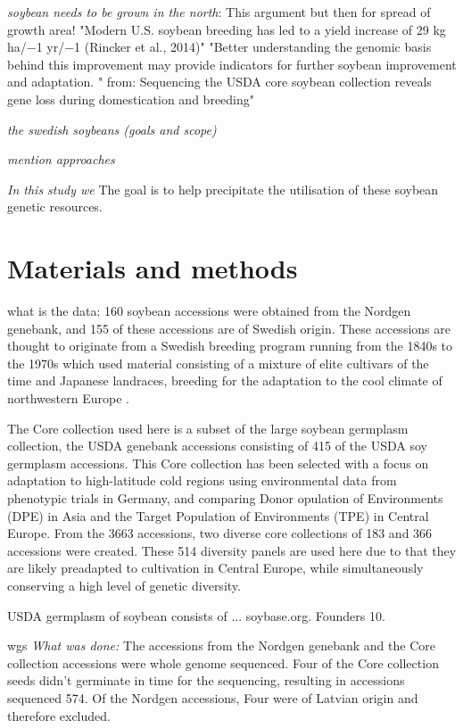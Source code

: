 \documentclass[9pt, onecolumn,twoside]{gsajnl}
\begin{document}
\textit{soybean needs to be grown in the north}:  This argument but then for spread of growth area! "Modern U.S. soybean breeding has led to a yield increase of 29 kg ha/−1 yr/−1 (Rincker et al., 2014)" 
 "Better understanding the genomic basis behind this improvement may provide indicators for further soybean improvement and adaptation. "  from: Sequencing the USDA core soybean collection reveals gene loss during domestication and breeding"

\textit{the swedish soybeans (goals and scope)}

\textit{mention approaches}

\textit{In this study we}
The goal is to help precipitate the utilisation of these soybean genetic resources. 

\section{Materials and methods}
\label{sec:materials:methods}

what is the data: 160 soybean accessions were obtained from the Nordgen genebank, and 155 of these accessions are of Swedish origin. These accessions are thought to originate from a Swedish breeding program running from the 1840s to the 1970s which used material consisting of a mixture of elite cultivars of the time and Japanese landraces, breeding for the adaptation to the cool climate of northwestern Europe \cite{holmberg1973}. 
 
The Core collection used here is a subset of the large soybean germplasm collection, the  USDA genebank accessions consisting of 415 of the USDA soy germplasm accessions. This Core collection has been selected with a focus on adaptation to high-latitude cold regions using environmental data from phenotypic trials in Germany, and comparing Donor opulation of Environments (DPE) in Asia and the Target Population of Environments (TPE) in Central Europe. From the 3663 accessions, two diverse core collections of 183 and 366 accessions were created. These 514 diversity panels are used here due to that they are likely preadapted to cultivation in Central Europe, while simultaneously conserving a high level of genetic diversity.  

USDA germplasm of soybean consists of ... soybase.org.  Founders 10. 

wgs
\textit{What was done:} The accessions from the Nordgen genebank and the Core collection accessions were whole genome sequenced. Four of the Core collection seeds didn't germinate in time for the sequencing, resulting in accessions sequenced 574. Of the Nordgen accessions, Four were of Latvian origin and therefore excluded. 
\end{document}
